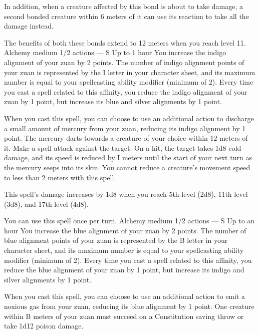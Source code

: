     In addition, when a creature affected by this bond is about to take damage, a second bonded creature within 6 meters of it can use its reaction to take all the damage instead.

    The benefits of both these bonds extend to 12 meters when you reach level 11.
    {Alchemy medium}
    {1/2 actions}
    {---}
    {S}
    {Up to 1 hour}
    You increase the indigo alignment of your zuan by 2 points.
    The number of indigo alignment points of your zuan is represented by the I letter in your character sheet, and its maximum number is equal to your spellcasting ability modifier (minimum of 2).
    Every time you cast a spell related to this affinity, you reduce the indigo alignment of your zuan by 1 point, but increase its blue and silver alignments by 1 point.

    When you cast this spell, you can choose to use an additional action to discharge a small amount of mercury from your zuan, reducing its indigo alignment by 1 point.
    The mercury darts towards a creature of your choice within 12 meters of it.
    Make a spell attack against the target.
    On a hit, the target takes 1d8 cold damage, and its speed is reduced by I meters until the start of your next turn as the mercury seeps into its skin.
    You cannot reduce a creature's movement speed to less than 2 meters with this spell.

    This spell's damage increases by 1d8 when you reach 5th level (2d8), 11th level (3d8), and 17th level (4d8).

    You can use this spell once per turn.
    {Alchemy medium}
    {1/2 actions}
    {---}
    {S}
    {Up to an hour}
    You increase the blue alignment of your zuan by 2 points.
    The number of blue alignment points of your zuan is represented by the B letter in your character sheet, and its maximum number is equal to your spellcasting ability modifier (minimum of 2).
    Every time you cast a spell related to this affinity, you reduce the blue alignment of your zuan by 1 point, but increase its indigo and silver alignments by 1 point.

    When you cast this spell, you can choose to use an additional action to emit a noxious gas from your zuan, reducing its blue alignment by 1 point.
    One creature within B meters of your zuan must succeed on a Constitution saving throw or take 1d12 poison damage.

